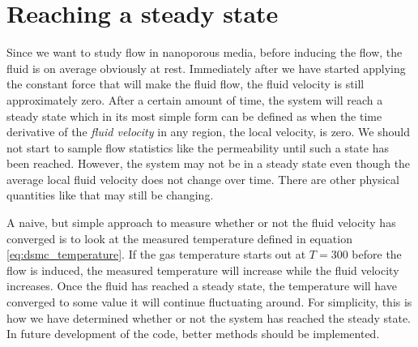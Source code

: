 \section{Reaching a steady state}
\label{sec:dsmc_steady_state}
Since we want to study flow in nanoporous media, before inducing the flow, the fluid is on average obviously at rest. Immediately after we have started applying the constant force that will make the fluid flow, the fluid velocity is still approximately zero. After a certain amount of time, the system will reach a steady state which in its most simple form can be defined as when the time derivative of the \textit{fluid velocity} in any region, the local velocity, is zero. We should not start to sample flow statistics like the permeability until such a state has been reached. However, the system may not be in a steady state even though the average local fluid velocity does not change over time. There are other physical quantities like that may still be changing.

A naive, but simple approach to measure whether or not the fluid velocity has converged is to look at the measured temperature defined in equation \eqref{eq:dsmc_temperature}. If the gas temperature starts out at $T= $\unit{300}{\kelvin} before the flow is induced, the measured temperature will increase while the fluid velocity increases. Once the fluid has reached a steady state, the temperature will have converged to some value it will continue fluctuating around. For simplicity, this is how we have determined whether or not the system has reached the steady state. In future development of the code, better methods should be implemented.